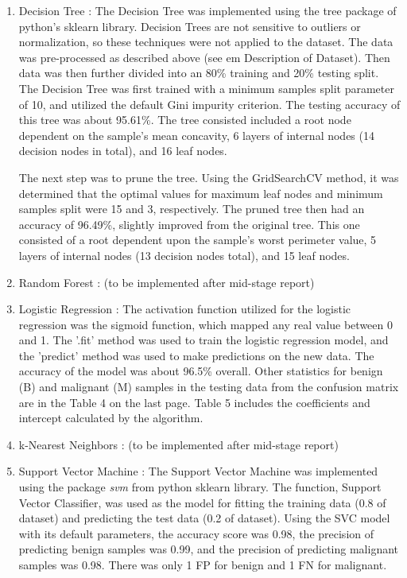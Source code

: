 \documentclass[conference]{IEEEtran}
\begin{document}
\begin{enumerate}
     \item Decision Tree : The Decision Tree was implemented using the tree package of python's sklearn library. Decision Trees are not sensitive to outliers or normalization, so these techniques were not applied to the dataset. The data was pre-processed as described above (see {em Description of Dataset}). Then data was then further divided into an 80\% training and 20\% testing split.
     The Decision Tree was first trained with a minimum samples split parameter of 10, and utilized the default Gini impurity criterion. The testing accuracy of this tree was about 95.61\%. The tree consisted included a root node dependent on the sample's mean concavity, 6 layers of internal nodes (14 decision nodes in total), and 16 leaf nodes.
    
    The next step was to prune the tree. Using the GridSearchCV method, it was determined that the optimal values for maximum leaf nodes and minimum samples split were 15 and 3, respectively. The pruned tree then had an accuracy of 96.49\%, slightly improved from the original tree. This one consisted of a root dependent upon the sample's worst perimeter value, 5 layers of internal nodes (13 decision nodes total), and 15 leaf nodes.

    \item Random Forest : (to be implemented after mid-stage report)

    \item Logistic Regression : The activation function utilized for the logistic regression was the sigmoid function, which mapped any real value between 0 and 1. The '.fit' method was used to train the logistic regression model, and the 'predict' method was used to make predictions on the new data. The accuracy of the model was about 96.5\% overall. Other statistics for benign (B) and malignant (M) samples in the testing data from the confusion matrix are in the Table 4 on the last page. Table 5 includes the coefficients and intercept calculated by the algorithm.
    
    \item k-Nearest Neighbors : (to be implemented after mid-stage report)

    \item Support Vector Machine : The Support Vector Machine was implemented using the package {\em svm} from python sklearn library. The function, Support Vector Classifier, was used as the model for fitting the training data (0.8 of dataset) and predicting the test data (0.2 of dataset). Using the SVC model with its default parameters, the accuracy score was 0.98, the precision of predicting benign samples was 0.99, and the precision of predicting malignant samples was 0.98. There was only 1 FP for benign and 1 FN for malignant. 
	

\end{enumerate}
\end{document}
